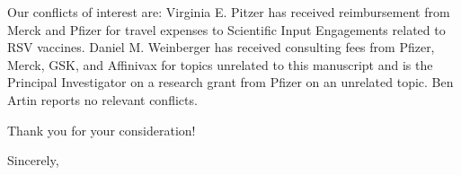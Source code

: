 \documentclass[10pt]{letter} %
\begin{document}
\begin{letter}{}
Our conflicts of interest are: Virginia E. Pitzer has received reimbursement from Merck and Pfizer for travel expenses to Scientific Input Engagements related to RSV vaccines. Daniel M. Weinberger has received consulting fees from Pfizer, Merck, GSK, and Affinivax for topics unrelated to this manuscript and is the Principal Investigator on a research grant from Pfizer on an unrelated topic. Ben Artin reports no relevant conflicts.

Thank you for your consideration!

\vspace{1\parskip} %
\closing{Sincerely,}
\vspace{1\parskip} %


\end{letter}
 
\end{document}
